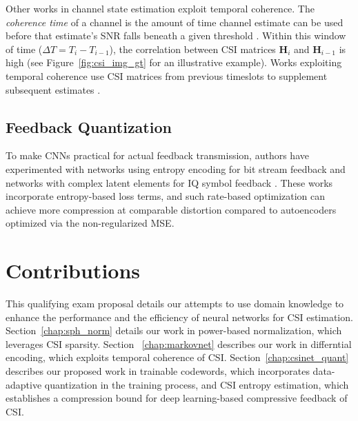 Other works in channel state estimation exploit temporal coherence. The \emph{coherence time} of a channel is the amount of time channel estimate can be used before that estimate's SNR falls beneath a given threshold \cite{ref:Chopra2016ChannelAging}. Within this window of time ($\Delta T = T_i - T_{i-1}$), the correlation between CSI matrices $\mathbf H_{i}$ and $\mathbf H_{i-1}$ is high (see Figure~\ref{fig:csi_img_gt} for an illustrative example). Works exploiting temporal coherence use CSI matrices from previous timeslots to supplement subsequent estimates \cite{ref:Wang2019CsiNetLSTM}.

\subsection{Feedback Quantization}

To make CNNs practical for actual feedback transmission, authors have experimented with networks using entropy encoding for bit stream feedback \cite{ref:Yang2019DeepCMC} and networks with complex latent elements for IQ symbol feedback \cite{ref:Mashhadi2020AnalogDeepCMC}. These works incorporate entropy-based loss terms, and such rate-based optimization can achieve more compression at comparable distortion compared to autoencoders optimized via the non-regularized MSE. 

\section{Contributions}

This qualifying exam proposal details our attempts to use domain knowledge to enhance the performance and the efficiency of neural networks for CSI estimation. Section~\ref{chap:sph_norm} details our work in power-based normalization, which leverages CSI sparsity. Section ~\ref{chap:markovnet} describes our work in differntial encoding, which exploits temporal coherence of CSI. Section~\ref{chap:csinet_quant} describes our proposed work in trainable codewords, which incorporates data-adaptive quantization in the training process, and CSI entropy estimation, which establishes a compression bound for deep learning-based compressive feedback of CSI.